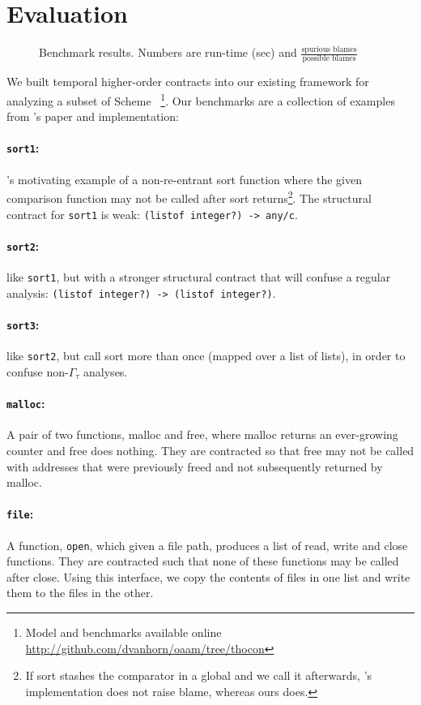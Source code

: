 \section{Evaluation}\label{sec:evaluation}

\begin{figure}
  
  \caption{Benchmark results. Numbers are run-time (sec) and $\frac{\text{spurious blames}}{\text{possible blames}}$}
  \label{fig:evaluation}
\end{figure}
We built temporal higher-order contracts into our existing framework for analyzing a subset of Scheme~\citep{ianjohnson:oaam:icfp2013} \footnote{Model and benchmarks available online \url{http://github.com/dvanhorn/oaam/tree/thocon}}.
%
Our benchmarks are a collection of examples from \dfm's paper and implementation:
\paragraph{{\tt sort1}:}{\dfm's motivating example of a non-re-entrant sort function where the given comparison function may not be called after sort returns\footnote{If sort stashes the comparator in a global and we call it afterwards, \dfm's implementation does not raise blame, whereas ours does.}.
%
The structural contract for {\tt sort1} is weak: {\tt (listof integer?) -> any/c}.
}
\paragraph{{\tt sort2}:}{like {\tt sort1}, but with a stronger structural contract that will confuse a regular analysis: {\tt (listof integer?) -> (listof integer?)}.}
\paragraph{{\tt sort3}:}{like {\tt sort2}, but call sort more than once (mapped over a list of lists), in order to confuse non-$\Gamma_\tau$ analyses.}
\paragraph{{\tt malloc}:}{A pair of two functions, malloc and free, where malloc returns an ever-growing counter and free does nothing. They are contracted so that free may not be called with addresses that were previously freed and not subsequently returned by malloc.}
\paragraph{{\tt file}:}{A function, {\tt open}, which given a file path, produces a list of read, write and close functions. They are contracted such that none of these functions may be called after close. Using this interface, we copy the contents of files in one list and write them to the files in the other.}

